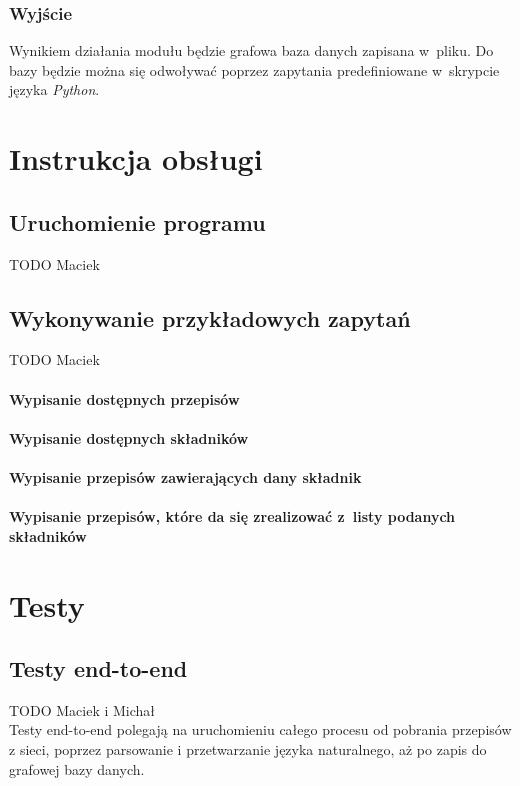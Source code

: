 \documentclass[11pt,a4paper]{article}
\begin{document}
\subsubsection{Wyjście}
Wynikiem działania modułu będzie grafowa baza danych zapisana w~pliku. Do bazy będzie można się odwoływać poprzez zapytania predefiniowane w~skrypcie języka \textit{Python}.

\section{Instrukcja obsługi}
\subsection{Uruchomienie programu}
TODO Maciek

\subsection{Wykonywanie przykładowych zapytań}
TODO Maciek
\paragraph{Wypisanie dostępnych przepisów}
\paragraph{Wypisanie dostępnych składników}
\paragraph{Wypisanie przepisów zawierających dany składnik}
\paragraph{Wypisanie przepisów, które da się zrealizować z~listy podanych składników}

\section{Testy}
\subsection{Testy end-to-end}
TODO Maciek i Michał\\
Testy end-to-end polegają na uruchomieniu całego procesu od pobrania przepisów z sieci, poprzez parsowanie i przetwarzanie języka naturalnego, aż po zapis do grafowej bazy danych.
\end{document}
